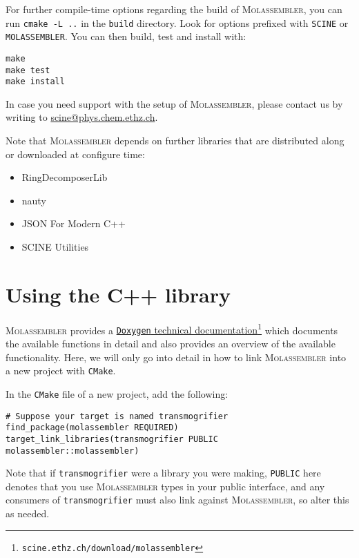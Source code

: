 \documentclass[]{tufte-book}
\begin{document}
For further compile-time options regarding the build of \textsc{Molassembler},
you can run \texttt{cmake -L ..} in the \texttt{build} directory. Look for
options prefixed with \texttt{SCINE} or \texttt{MOLASSEMBLER}. You can then
build, test and install with:

\begin{Verbatim}
make
make test
make install
\end{Verbatim}

In case you need support with the setup of \textsc{Molassembler}, please contact
us by writing to \href{mailto:scine@phys.chem.ethz.ch}{scine@phys.chem.ethz.ch}.

Note that \textsc{Molassembler} depends on further libraries that are
distributed along or downloaded at configure time:

\begin{itemize}
  \item RingDecomposerLib~\cite{Flachsenberg2017, Kolodzik2012} 
  \item nauty~\cite{McKay2014}
  \item JSON For Modern C++~\cite{Lohmann2013} 
  \item SCINE Utilities~\cite{Brunken2019}
\end{itemize}


\chapter{Using the C++ library}

\textsc{Molassembler} provides a
\href{https://scine.ethz.ch/static/download/documentation/molassembler/v1.2.0/cpp}{\texttt{Doxygen}
technical
documentation}\footnote{\texttt{scine.ethz.ch/download/molassembler}}
which documents the available functions in detail and also provides an overview
of the available functionality. Here, we will only go into detail in how to link
\textsc{Molassembler} into a new project with \texttt{CMake}.

In the \texttt{CMake} file of a new project, add the following:

\begin{Verbatim}
# Suppose your target is named transmogrifier
find_package(molassembler REQUIRED)
target_link_libraries(transmogrifier PUBLIC molassembler::molassembler)
\end{Verbatim}

Note that if \texttt{transmogrifier} were a library you were making,
\texttt{PUBLIC} here denotes that you use \textsc{Molassembler} types in your
public interface, and any consumers of \texttt{transmogrifier} must also link
against \textsc{Molassembler}, so alter this as needed.
\end{document}
